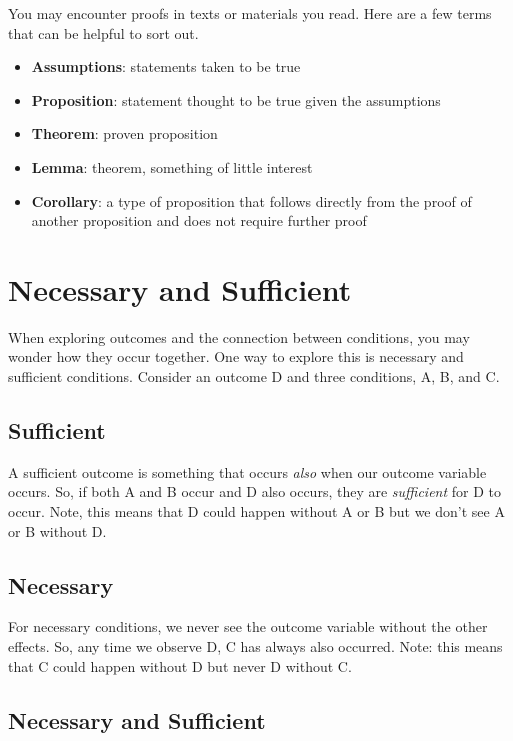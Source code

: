 \documentclass[
]{book}
\begin{document}
You may encounter proofs in texts or materials you read. Here are a few terms that can be helpful to sort out.

\begin{itemize}
\item
  \textbf{Assumptions}: statements taken to be true
\item
  \textbf{Proposition}: statement thought to be true given the assumptions
\item
  \textbf{Theorem}: proven proposition
\item
  \textbf{Lemma}: theorem, something of little interest
\item
  \textbf{Corollary}: a type of proposition that follows directly from the proof of another proposition and does not require further proof
\end{itemize}

\hypertarget{necessary-and-sufficient}{%
\section{Necessary and Sufficient}\label{necessary-and-sufficient}}

When exploring outcomes and the connection between conditions, you may wonder how they occur together. One way to explore this is necessary and sufficient conditions. Consider an outcome D and three conditions, A, B, and C.

\hypertarget{sufficient}{%
\subsection{Sufficient}\label{sufficient}}

A sufficient outcome is something that occurs \emph{also} when our outcome variable occurs. So, if both A and B occur and D also occurs, they are \emph{sufficient} for D to occur. Note, this means that D could happen without A or B but we don't see A or B without D.

\hypertarget{necessary}{%
\subsection{Necessary}\label{necessary}}

For necessary conditions, we never see the outcome variable without the other effects. So, any time we observe D, C has always also occurred. Note: this means that C could happen without D but never D without C.

\hypertarget{necessary-and-sufficient-1}{%
\subsection{Necessary and Sufficient}\label{necessary-and-sufficient-1}}
\end{document}

